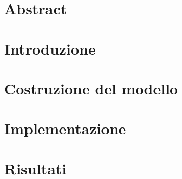 \documentclass[12pt,a4paper]{report}
\begin{document}
\chapter*{\centering \Large Abstract}

\tableofcontents
\listoffigures

\chapter*{Introduzione}


\chapter{Costruzione del modello}


\chapter{Implementazione}


\chapter{Risultati}


\printbibliography
\end{document}

